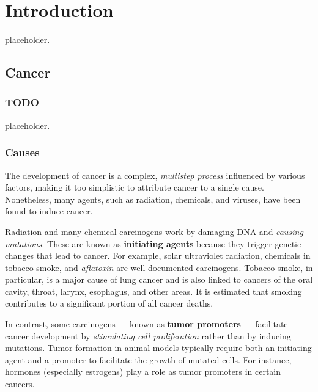 \chapter{Introduction} \label{chap:introduction}

placeholder. 

\section{Cancer}

\subsection{TODO}

placeholder. 


\subsection{Causes}

The development of cancer is a complex, \textit{multistep process} influenced by various factors, making it too simplistic to attribute cancer to a single cause. Nonetheless, many agents, such as radiation, chemicals, and viruses, have been found to induce cancer.

Radiation and many chemical carcinogens work by damaging DNA and \textit{causing mutations}. These are known as \textbf{initiating agents} because they trigger genetic changes that lead to cancer. For example, solar ultraviolet radiation, chemicals in tobacco smoke, and \href{https://en.wikipedia.org/wiki/Aflatoxin}{\textit{aflatoxin}} are well-documented carcinogens. Tobacco smoke, in particular, is a major cause of lung cancer and is also linked to cancers of the oral cavity, throat, larynx, esophagus, and other areas. It is estimated that smoking contributes to a significant portion of all cancer deaths.

In contrast, some carcinogens --- known as \textbf{tumor promoters} --- facilitate cancer development by \textit{stimulating cell proliferation} rather than by inducing mutations. Tumor formation in animal models typically require both an initiating agent and a promoter to facilitate the growth of mutated cells. For instance, hormones (especially estrogens) play a role as tumor promoters in certain cancers.

